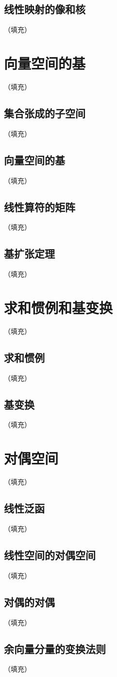 \documentclass[hyperref,UTF8]{ctexbook}
\begin{document}
\subsection{线性映射的像和核}（填充）
\section{向量空间的基}（填充）
\subsection{集合张成的子空间}（填充）
\subsection{向量空间的基}（填充）
\subsection{线性算符的矩阵}（填充）
\subsection{基扩张定理}（填充）
\section{求和惯例和基变换}（填充）
\subsection{求和惯例}（填充）
\subsection{基变换}（填充）
\section{对偶空间}（填充）
\subsection{线性泛函}（填充）
\subsection{线性空间的对偶空间}（填充）
\subsection{对偶的对偶}（填充）
\subsection{余向量分量的变换法则}（填充）
\end{document}
